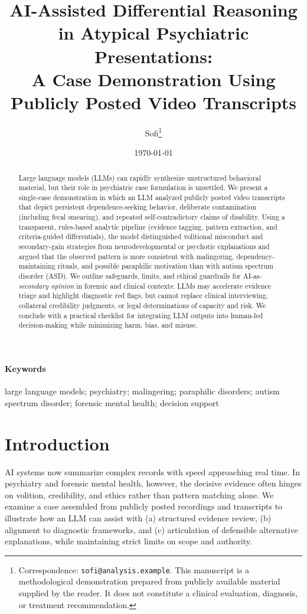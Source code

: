 \documentclass[12pt]{article}
\title{\vspace{-1em}AI-Assisted Differential Reasoning in Atypical Psychiatric Presentations:\\
A Case Demonstration Using Publicly Posted Video Transcripts}
\author{Sofi\thanks{Correspondence: \texttt{sofi@analysis.example}. This manuscript is a methodological demonstration prepared from publicly available material supplied by the reader. It does not constitute a clinical evaluation, diagnosis, or treatment recommendation.}\\[0.5em]}
\date{\today}
\begin{document}
\maketitle
\doublespacing

\begin{abstract}
\noindent
Large language models (LLMs) can rapidly synthesize unstructured behavioral material, but their role in psychiatric case formulation is unsettled. We present a single-case demonstration in which an LLM analyzed publicly posted video transcripts that depict persistent dependence-seeking behavior, deliberate contamination (including fecal smearing), and repeated self-contradictory claims of disability. Using a transparent, rules-based analytic pipeline (evidence tagging, pattern extraction, and criteria-guided differentials), the model distinguished volitional misconduct and secondary-gain strategies from neurodevelopmental or psychotic explanations and argued that the observed pattern is more consistent with malingering, dependency-maintaining rituals, and possible paraphilic motivation than with autism spectrum disorder (ASD). We outline safeguards, limits, and ethical guardrails for AI-as-\emph{secondary opinion} in forensic and clinical contexts: LLMs may accelerate evidence triage and highlight diagnostic red flags, but cannot replace clinical interviewing, collateral credibility judgments, or legal determinations of capacity and risk. We conclude with a practical checklist for integrating LLM outputs into human-led decision-making while minimizing harm, bias, and misuse.
\end{abstract}

\paragraph{Keywords} large language models; psychiatry; malingering; paraphilic disorders; autism spectrum disorder; forensic mental health; decision support

\section{Introduction}
AI systems now summarize complex records with speed approaching real time. In psychiatry and forensic mental health, however, the decisive evidence often hinges on volition, credibility, and ethics rather than pattern matching alone. We examine a case assembled from publicly posted recordings and transcripts to illustrate how an LLM can assist with (a) structured evidence review, (b) alignment to diagnostic frameworks, and (c) articulation of defensible alternative explanations, while maintaining strict limits on scope and authority.
\end{document}

